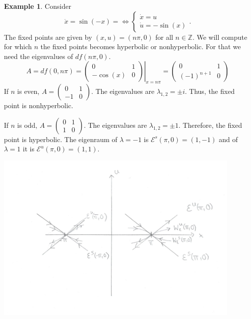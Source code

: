 \documentclass[hidelinks,a4paper, 11pt]{article}
\theoremstyle{plain}
\theoremstyle{break}
\theoremstyle{plain}
\theoremstyle{definition}
\newtheorem*{example}{Example}
\begin{document}
{\begin{example}
	Consider 
	\[
		\ddot{ x} = \sin{(-  x)}= \iff \begin{cases}
			{\dot x} =  u \\
			{\dot u} = - \sin ( x)
		\end{cases}.
	\]
	The fixed points are given by $(x,u) = (n\pi, 0)$ for all $n \in \mathbb Z$. We will compute for which $n$ the fixed points becomes hyperbolic or nonhyperbolic. For that we need the eigenvalues of $df(n\pi,0)$.
	\[
		A = df(0,n \pi) = \left. \begin{pmatrix}
			0 & 1 \\
			- \cos(x) & 0
		\end{pmatrix}  \right |_{x = n\pi} = \begin{pmatrix}
			0 & 1 \\ (-1)^{n+1} & 0
		\end{pmatrix}
	\]
	If $n$ is even, $A = (\begin{smallmatrix}
		0 & 1 \\ -1 & 0
	\end{smallmatrix})$. The eigenvalues are $\lambda_{1,2} = \pm i$. Thus, the fixed point is nonhyperbolic.
	
	If $n$ is odd, $A = (\begin{smallmatrix}
	0 & 1 \\ 1 & 0
	\end{smallmatrix})$. The eigenvalues are $\lambda_{1,2} = \pm 1$. Therefore, the fixed point is hyperbolic. The eigenraum of $\lambda = -1$ is $\mathcal E^s(\pi,0) = (1,-1)$ and of $\lambda = 1$ it is $\mathcal E^u(\pi,0) = (1,1)$.
	
	\includegraphics[width=12cm]{local_manifold.png}
\end{example}

}
\end{document}
